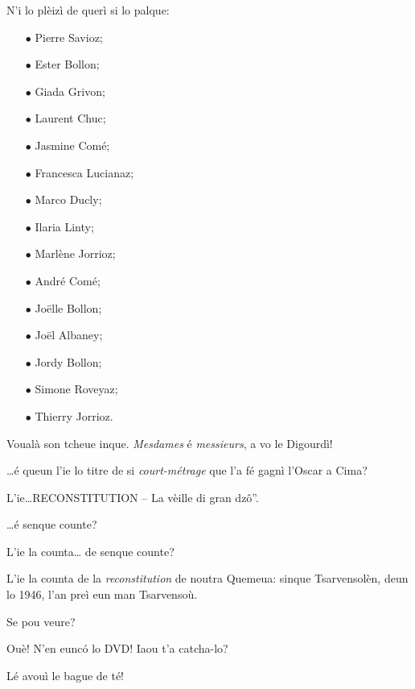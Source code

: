 \begin{drama}
\Conducteurspeaks N'i lo plèizì de querì si lo palque:
\begin{itemize}
\item[$\bullet$] Pierre Savioz;
\item[$\bullet$] Ester Bollon;
\item[$\bullet$] Giada Grivon;
\item[$\bullet$] Laurent Chuc;
\item[$\bullet$] Jasmine Comé;
\item[$\bullet$] Francesca Lucianaz;
\item[$\bullet$] Marco Ducly;
\item[$\bullet$] Ilaria Linty;
\item[$\bullet$] Marlène Jorrioz;
\item[$\bullet$] André Comé;
\item[$\bullet$] Jo\"{e}lle Bollon;
\item[$\bullet$] Jo\"{e}l Albaney;
\item[$\bullet$] Jordy Bollon;
\item[$\bullet$] Simone Roveyaz;
\item[$\bullet$] Thierry Jorrioz.
\end{itemize}


\Conducteurspeaks Voualà son tcheue inque. \textit{Mesdames} é \textit{messieurs}, a vo le Digourdì!




\Nevaouspeaks \ldots é queun l'ie lo titre de si \textit{court-métrage} que l'a fé gagnì l’Oscar a Cima?

\Paganspeaks L'ie\ldots \og RECONSTITUTION – La vèille di gran dz\^o''.

\Nevaousaspeaks \ldots é senque counte?

\Paganspeaks L'ie la counta\ldots {} de senque counte?

\Maganspeaks L'ie la counta de la \textit{reconstitution} de noutra Quemeua: sinque Tsarvensolèn, deun lo 1946, l'an preì eun man Tsarvensoù.

\Nevaouspeaks Se pou veure?

\Paganspeaks Ouè! N'en euncó lo DVD! Iaou t'a catcha-lo?

\Maganspeaks Lé avouì le bague de té!


\end{drama}
